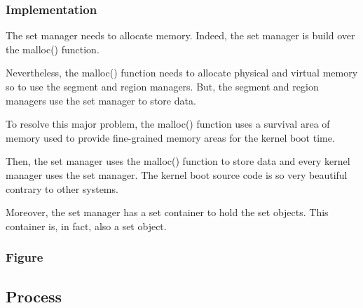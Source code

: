 
\begin{frame}
  \frametitle{Implementation}

  The set manager needs to allocate memory. Indeed, the set manager
  is build over the malloc() function.

  \-

  Nevertheless, the malloc() function needs to allocate physical and
  virtual memory so to use the segment and region managers. But, the
  segment and region managers use the set manager to store data.

  \-

  To resolve this major problem, the malloc() function uses a survival area
  of memory used to provide fine-grained memory areas for the kernel
  boot time.

  \-

  Then, the set manager uses the malloc() function to store data and
  every kernel manager uses the set manager. The kernel boot source code
  is so very beautiful contrary to other systems.

  \-

  Moreover, the set manager has a set container to hold the set objects. This
  container is, in fact, also a set object.
\end{frame}


\begin{frame}
  \frametitle{Figure}

  \begin{center}
  \end{center}
\end{frame}

%
%

\subsection{Process}


